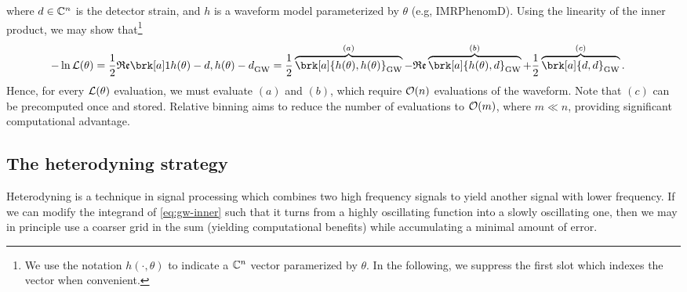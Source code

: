 where $d \in \mathbb{C}^n$ is the detector strain, and $h$ is a waveform model parameterized by $\theta$ (e.g, IMRPhenomD).
Using the linearity of the inner product, we may show that\footnote{We use the notation $h(\cdot, \theta)$ to indicate a $\mathbb{C}^n$ vector paramerized by $\theta$.
In the following, we suppress the first slot which indexes the vector when convenient.}
\begin{align*}\label{}
-\ln \like (\theta) &= \frac{1}{2} \re \brk[a]1{h(\theta) - d,h(\theta) - d}_{\text{GW}} = \frac{1}{2}\overbrace{\brk[a]{h(\theta), h(\theta)}_{\text{GW}}}^{(a)} - \re \overbrace{\brk[a]{h(\theta), d}_{\text{GW}}}^{(b)} + \frac{1}{2}\overbrace{\brk[a]{d, d}_{\text{GW}}}^{\text(c)}.
\end{align*}
Hence, for every $\mathcal{L}(\theta)$ evaluation, we must evaluate $(a)$ and $(b)$, which require $\mathcal{O}(n)$ evaluations of the waveform.
Note that $(c)$ can be precomputed once and stored.
Relative binning aims to reduce the number of evaluations to $\mathcal{O}(m)$, where $m \ll n$, providing significant computational advantage.


\subsection{The heterodyning strategy}
Heterodyning is a technique in signal processing which combines two high frequency signals to yield another signal with lower frequency.
If we can modify the integrand of \cref{eq:gw-inner} such that it turns from a highly oscillating function into a slowly oscillating one, then we may in principle use a coarser grid in the sum (yielding computational benefits) while accumulating a minimal amount of error.

